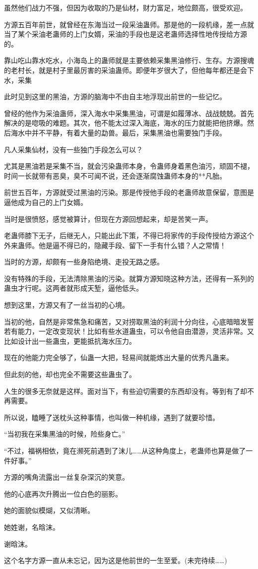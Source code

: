 \begin{this_body}
虽然他们战力不强，但因为收取的乃是仙材，财力富足，地位颇高，很受欢迎。

方源五百年前世，就曾经在东海当过一段采油蛊师。那是他的一段机缘，差一点就当了某个采油老蛊师的上门女婿，采油的手段也是这老蛊师选择性地传授给方源的。

靠山吃山靠水吃水，小海岛上的蛊师就是主要依赖采集黑油修行、生存。方源搜魂的老村长，就是村子里最厉害的采油蛊师。即便年岁很大了，但他每年都还是会下水，采集

此时见到这里的黑油，方源的脑海中不由自主地浮现出前世的一些记忆。

曾经的他作为采油蛊师，深入海水中采集黑油，可谓是如履薄冰、战战兢兢。首先解决的是唿吸的难题。其次，他不能太过深入海底，海水的压力就能把他挤爆。然后海水中并不平静，有着大量的勐兽。最后，采集黑油也需要独门手段。

凡人采集仙材，没有一些独门手段怎么可以？

尤其是黑油若是采集不当，就会污染蛊师本身，令蛊师身着黑色油污，顽固不褪，时间一长就带有恶臭，臭不可闻不说，还会逐渐腐蚀蛊师本身的**凡胎。

前世五百年，方源就受过黑油的污染。那是传授他手段的老蛊师故意保留，意图是逼他成为自己的上门女婿。

当时是很愤怒，感觉被算计，但现在方源回想起来，却是苦笑一声。

老蛊师膝下无子，后继无人，只能出此下策，不得已将家传的手段传授给方源这个外来蛊师。他是逼不得已的，隐藏手段、留下一手有什么错？人之常情！

当时的方源，却颇有一些身陷绝境、走投无路之感。

没有特殊的手段，无法清除黑油的污染。就算方源知晓这种方法，还得有一系列的蛊虫才行呢。这两者就形成天堑，逼他低头。

想到这里，方源又有了一丝当初的心境。

当初的他，自然是非常焦急和痛苦，又对捞取黑油的利润十分向往，心底暗暗发誓若有能力，一定改变现状！比如有些水道蛊虫，可以令他自由潜游，灵活非常。又比如设计出一些蛊虫，更能抵抗海水压力。

现在的他能力完全够了，仙蛊一大把，轻易间就能炼出大量的优秀凡蛊来。

但此刻的他，却也完全不需要这些蛊虫了。

人生的很多无奈就是这样。面对当下，有些迫切需要的东西却没有。等到有了却不再需要。

所以说，瞌睡了送枕头这种事情，也叫做一种机缘，遇到了就要珍惜。

“当初我在采集黑油的时候，险些身亡。”

“不过，福祸相依，竟在濒死前遇到了沫儿……从这种角度上，老蛊师也算是做了一件好事。”

方源的嘴角流露出一丝复杂深沉的笑意。

他的心底再次升腾出一位白色的丽影。

她的面貌似模煳，又似清晰。

她姓谢，名晗沫。

谢晗沫。

这个名字方源一直从未忘记，因为这是他前世的一生至爱。(未完待续……)

\end{this_body}

